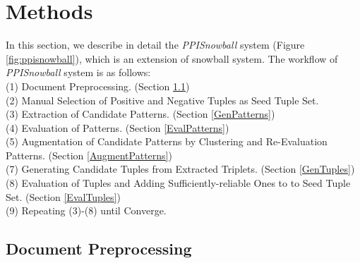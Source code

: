 
\section{Methods}

In this section, we describe in detail the \emph{PPISnowball} system (Figure \ref{fig:ppisnowball}), which is an extension of snowball system\cite{Agichtein.Gravano:2000}. The workflow of \emph{PPISnowball} system is as follows:\\
(1) Document Preprocessing. (Section \ref{DocumentPreprocessing})\\
(2) Manual Selection of Positive and Negative Tuples as Seed Tuple Set.\\
(3) Extraction of Candidate Patterns. (Section \ref{GenPatterns})\\
(4) Evaluation of Patterns. (Section \ref{EvalPatterns})\\
(5) Augmentation of Candidate Patterns by Clustering and Re-Evaluation Patterns. (Section \ref{AugmentPatterns})\\
(7) Generating Candidate Tuples from Extracted Triplets. (Section \ref{GenTuples})\\
(8) Evaluation of Tuples and Adding Sufficiently-reliable Ones to to Seed Tuple Set. (Section \ref{EvalTuples})\\
(9) Repeating (3)-(8) until Converge.\\


\subsection{Document Preprocessing}
\label{DocumentPreprocessing}
















